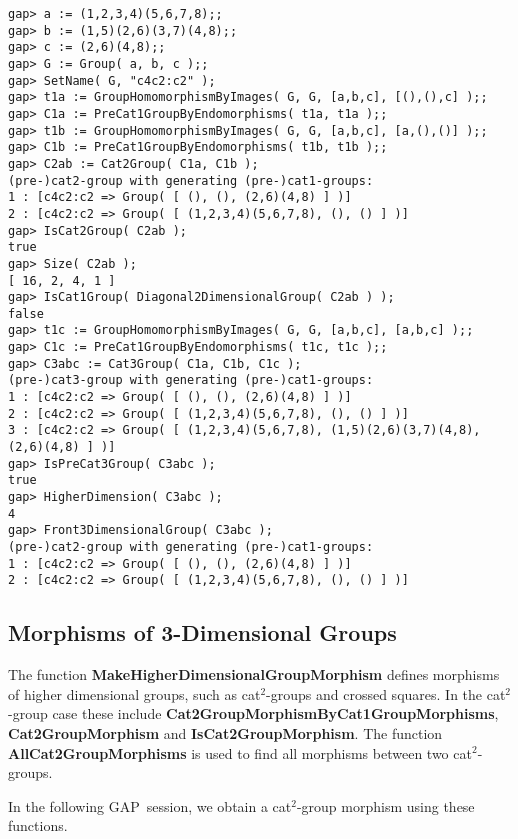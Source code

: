 \documentclass{ws-ijac}
\newcommand{\GAP}      {{\sf GAP}}
\begin{document}
\small{
\begin{verbatim} 
gap> a := (1,2,3,4)(5,6,7,8);;
gap> b := (1,5)(2,6)(3,7)(4,8);;
gap> c := (2,6)(4,8);;
gap> G := Group( a, b, c );;
gap> SetName( G, "c4c2:c2" ); 
gap> t1a := GroupHomomorphismByImages( G, G, [a,b,c], [(),(),c] );; 
gap> C1a := PreCat1GroupByEndomorphisms( t1a, t1a );;
gap> t1b := GroupHomomorphismByImages( G, G, [a,b,c], [a,(),()] );;
gap> C1b := PreCat1GroupByEndomorphisms( t1b, t1b );;
gap> C2ab := Cat2Group( C1a, C1b ); 
(pre-)cat2-group with generating (pre-)cat1-groups:
1 : [c4c2:c2 => Group( [ (), (), (2,6)(4,8) ] )]
2 : [c4c2:c2 => Group( [ (1,2,3,4)(5,6,7,8), (), () ] )]
gap> IsCat2Group( C2ab ); 
true
gap> Size( C2ab ); 
[ 16, 2, 4, 1 ]
gap> IsCat1Group( Diagonal2DimensionalGroup( C2ab ) ); 
false
gap> t1c := GroupHomomorphismByImages( G, G, [a,b,c], [a,b,c] );;
gap> C1c := PreCat1GroupByEndomorphisms( t1c, t1c );;
gap> C3abc := Cat3Group( C1a, C1b, C1c ); 
(pre-)cat3-group with generating (pre-)cat1-groups:
1 : [c4c2:c2 => Group( [ (), (), (2,6)(4,8) ] )]
2 : [c4c2:c2 => Group( [ (1,2,3,4)(5,6,7,8), (), () ] )]
3 : [c4c2:c2 => Group( [ (1,2,3,4)(5,6,7,8), (1,5)(2,6)(3,7)(4,8),
(2,6)(4,8) ] )]
gap> IsPreCat3Group( C3abc ); 
true
gap> HigherDimension( C3abc ); 
4
gap> Front3DimensionalGroup( C3abc ); 
(pre-)cat2-group with generating (pre-)cat1-groups:
1 : [c4c2:c2 => Group( [ (), (), (2,6)(4,8) ] )]
2 : [c4c2:c2 => Group( [ (1,2,3,4)(5,6,7,8), (), () ] )]
\end{verbatim}
}

\subsection{Morphisms of 3-Dimensional Groups}

The function \textbf{MakeHigherDimensionalGroupMorphism} defines morphisms of 
higher dimensional groups, such as cat$^2$-groups and crossed squares. 
In the cat$^2$-group case these include 
\textbf{Cat2GroupMorphismByCat1GroupMorphisms}, \textbf{Cat2GroupMorphism} 
and \textbf{IsCat2GroupMorphism}. 
The function \textbf{AllCat2GroupMorphisms} is used to find 
all morphisms between two cat$^2$-groups.

In the following \GAP\ session, we obtain a cat$^2$-group morphism
using these functions.
\end{document}
